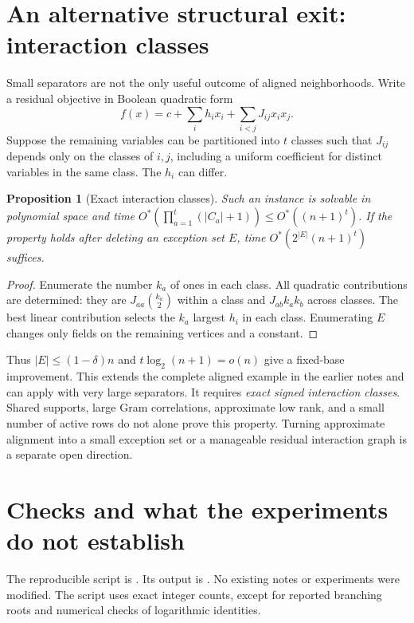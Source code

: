 \documentclass[11pt,a4paper]{article}
\newtheorem{proposition}{Proposition}
\theoremstyle{remark}
\newcommand{\Ostar}{O^{*}}
\begin{document}
\section{An alternative structural exit: interaction classes}

Small separators are not the only useful outcome of aligned neighborhoods.
Write a residual objective in Boolean quadratic form
\[
 f(x)=c+\sum_i h_i x_i+\sum_{i<j}J_{ij}x_i x_j.
\]
Suppose the remaining variables can be partitioned into $t$ classes such
that $J_{ij}$ depends only on the classes of $i,j$, including a uniform
coefficient for distinct variables in the same class. The $h_i$ can differ.

\begin{proposition}[Exact interaction classes]
Such an instance is solvable in polynomial space and time
$\Ostar(\prod_{a=1}^t(|C_a|+1))\le\Ostar((n+1)^t)$.
If the property holds after deleting an exception set $E$, time
$\Ostar(2^{|E|}(n+1)^t)$ suffices.
\end{proposition}
\begin{proof}
Enumerate the number $k_a$ of ones in each class. All quadratic contributions
are determined: they are $J_{aa}\binom{k_a}{2}$ within a class and
$J_{ab}k_a k_b$ across classes. The best linear contribution selects the
$k_a$ largest $h_i$ in each class. Enumerating $E$ changes only fields on
the remaining vertices and a constant.
\end{proof}

Thus $|E|\le(1-\delta)n$ and $t\log_2(n+1)=o(n)$ give a fixed-base
improvement. This extends the complete aligned example in the earlier notes
and can apply with very large separators. It requires \emph{exact signed
interaction classes}. Shared supports, large Gram correlations, approximate
low rank, and a small number of active rows do not alone prove this property.
Turning approximate alignment into a small exception set or a manageable
residual interaction graph is a separate open direction.

\section{Checks and what the experiments do not establish}

The reproducible script is .
Its output is . No existing notes or experiments
were modified. The script uses exact integer counts, except for reported
branching roots and numerical checks of logarithmic identities.
\end{document}

